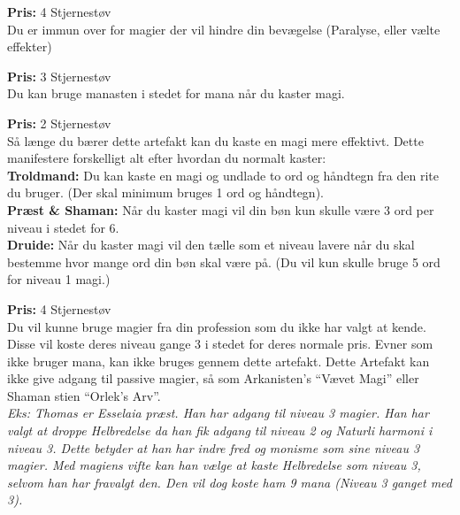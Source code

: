 \begin{artefakt*}
\textbf{Pris:} 4 Stjernestøv\\
Du er immun over for magier der vil hindre din bevægelse (Paralyse, eller vælte effekter)
\end{artefakt*}

\begin{artefakt*}
\textbf{Pris:} 3 Stjernestøv\\
Du kan bruge manasten i stedet for mana når du kaster magi.
\end{artefakt*} 

\begin{artefakt*}
\textbf{Pris:} 2 Stjernestøv\\
Så længe du bærer dette artefakt kan du kaste en magi mere effektivt. Dette manifestere forskelligt alt efter hvordan du normalt kaster:\\
\textbf{Troldmand:}  Du kan kaste en magi og undlade to ord og håndtegn fra den rite du bruger. (Der skal minimum bruges 1 ord og håndtegn).\\
\textbf{Præst \& Shaman:} Når du kaster magi vil din bøn kun skulle være 3 ord per niveau i stedet for 6.\\
\textbf{Druide:} Når du kaster magi vil den tælle som et niveau lavere når du skal bestemme hvor mange ord din bøn skal være på. (Du vil kun skulle bruge 5 ord for niveau 1 magi.)\\
\end{artefakt*}

\begin{artefakt*}
\textbf{Pris:} 4 Stjernestøv\\
Du vil kunne bruge magier fra din profession som du ikke har valgt at kende. Disse vil koste deres niveau gange 3 i stedet for deres normale pris. Evner som ikke bruger mana, kan ikke bruges gennem dette artefakt. Dette Artefakt kan ikke give adgang til passive magier, så som Arkanisten’s “Vævet Magi” eller Shaman stien “Orlek’s Arv”.\\
\textit{Eks: Thomas er Esselaia præst. Han har adgang til niveau 3 magier. Han har valgt at droppe Helbredelse da han fik adgang til niveau 2 og Naturli harmoni i niveau 3. Dette betyder at han har indre fred og monisme som sine niveau 3 magier. Med magiens vifte kan han vælge at kaste Helbredelse som niveau 3, selvom han har fravalgt den.  Den vil dog koste ham 9 mana (Niveau 3 ganget med 3). }
\end{artefakt*}